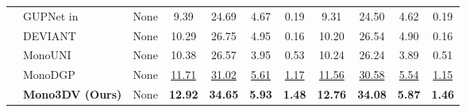 \begin{table}[!ht]
{\begin{tabular}{c|l|c|cccc|cccc}
 & GUPNet \cite{GUPNet} in \cite{DEVIANT} & None & 9.39 & 24.69 & 4.67 & 0.19 & 9.31 & 24.50 & 4.62 & 0.19 \\
 & DEVIANT \cite{DEVIANT} & None & 10.29 & 26.75 & 4.95 & 0.16 & 10.20 & 26.54 & 4.90 & 0.16 \\
 & MonoUNI \cite{MonoUNI} & None & 10.38 & 26.57 & 3.95 & 0.53 & 10.24 & 26.24 & 3.89 & 0.51\\
 & MonoDGP \cite{MonoDGP} & None & \underline{11.71} & \underline{31.02} & \underline{5.61} & \underline{1.17} & \underline{11.56} & \underline{30.58} & \underline{5.54} & \underline{1.15} \\ 
  & \textbf{Mono3DV (Ours)} & None & \textbf{12.92} & \textbf{34.65} & \textbf{5.93} & \textbf{1.48} & \textbf{12.76} & \textbf{34.08} & \textbf{5.87} & \textbf{1.46} \\
\hline 
\end{tabular}}
\label{tab:waymo_experiment}
\end{table}